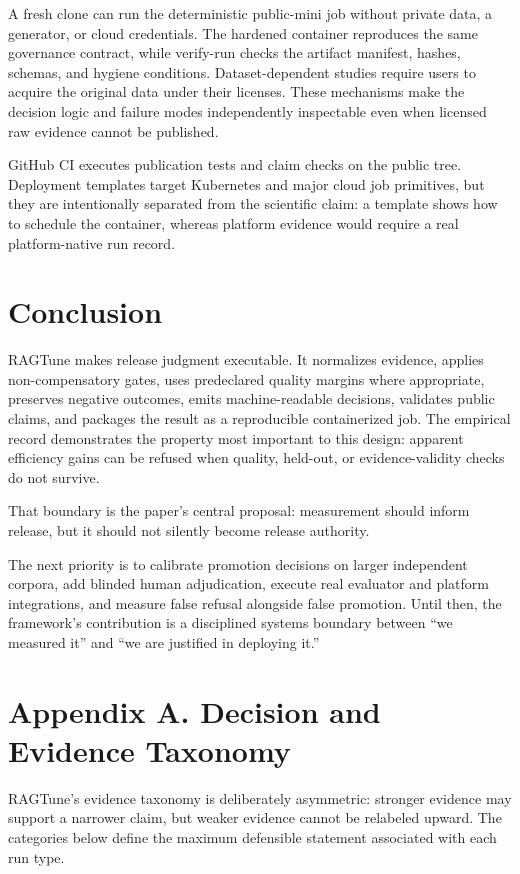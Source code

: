 \documentclass[11pt]{article}
\begin{document}
A fresh clone can run the deterministic public-mini job without private data, a generator, or cloud credentials. The hardened container reproduces the same governance contract, while verify-run checks the artifact manifest, hashes, schemas, and hygiene conditions. Dataset-dependent studies require users to acquire the original data under their licenses. These mechanisms make the decision logic and failure modes independently inspectable even when licensed raw evidence cannot be published.

GitHub CI executes publication tests and claim checks on the public tree. Deployment templates target Kubernetes and major cloud job primitives, but they are intentionally separated from the scientific claim: a template shows how to schedule the container, whereas platform evidence would require a real platform-native run record.

\section{Conclusion}
RAGTune makes release judgment executable. It normalizes evidence, applies non-compensatory gates, uses predeclared quality margins where appropriate, preserves negative outcomes, emits machine-readable decisions, validates public claims, and packages the result as a reproducible containerized job. The empirical record demonstrates the property most important to this design: apparent efficiency gains can be refused when quality, held-out, or evidence-validity checks do not survive.

That boundary is the paper's central proposal: measurement should inform release, but it should not silently become release authority.

The next priority is to calibrate promotion decisions on larger independent corpora, add blinded human adjudication, execute real evaluator and platform integrations, and measure false refusal alongside false promotion. Until then, the framework's contribution is a disciplined systems boundary between ``we measured it'' and ``we are justified in deploying it.''

\section{Appendix A. Decision and Evidence Taxonomy}
RAGTune's evidence taxonomy is deliberately asymmetric: stronger evidence may support a narrower claim, but weaker evidence cannot be relabeled upward. The categories below define the maximum defensible statement associated with each run type.
\end{document}
